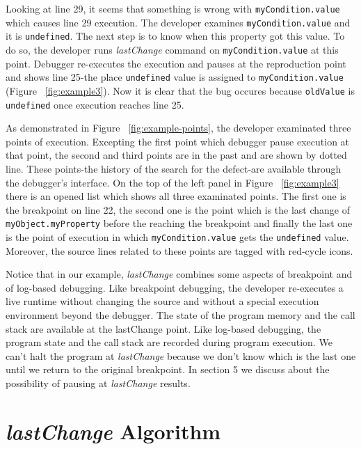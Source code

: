 \documentclass[preprint]{sigplanconf}
\begin{document}
Looking at line 29, it seems that something is wrong with \texttt{myCondition.value} which causes line 29 execution. The developer examines \texttt{myCondition.value} and it is \texttt{undefined}. The next step is to know when this property got this value. To do so, the developer runs \textit{lastChange} command on \texttt{myCondition.value} at this point. Debugger re-executes the execution and pauses at the reproduction point and shows line 25-the place \texttt{undefined} value is assigned to \texttt{myCondition.value} (Figure ~\ref{fig:example3}). Now it is clear that the bug occures because \texttt{oldValue} is \texttt{undefined} once execution reaches line 25.

As demonstrated in Figure ~\ref{fig:example-points}, the developer examinated three points of execution. Excepting the first point which debugger pause execution at that point, the second and third points are in the past and are shown by dotted line. These points-the history of the search for the defect-are available through the debugger's interface. On the top of the left panel in Figure ~\ref{fig:example3} there is an opened list which shows all three examinated points. The first one is the breakpoint on line 22, the second one is the point which is the last change of \texttt{myObject.myProperty} before the reaching the breakpoint and finally the last one is the point of execution in which \texttt{myCondition.value} gets the \texttt{undefined} value. Moreover, the source lines related to these points are tagged with red-cycle icons.

Notice that in our example, \textit{lastChange} combines some aspects of breakpoint and of log-based debugging. Like breakpoint debugging, the developer re-executes a live runtime without changing the source and without a special execution environment beyond the debugger. The state of the program memory and the call stack are available at the lastChange point. Like log-based debugging, the program state and the call stack are recorded during program execution. We can't halt the program at \textit{lastChange} because we don't know which is the last one until we return to the original breakpoint. In section 5 we discuss about the possibility of pausing at \textit{lastChange} results.

\section{\textit{lastChange} Algorithm}
\end{document}
